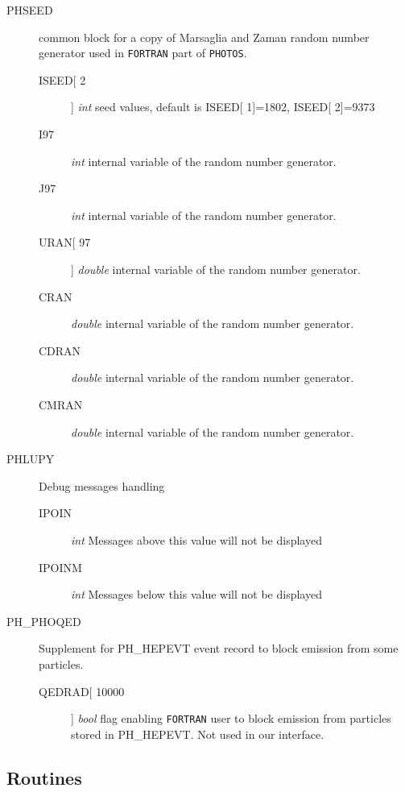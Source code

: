 \documentclass[]{Photos_interface_design}
\begin{document}
\begin{description}
\item[PHSEED] common block for a copy of Marsaglia and Zaman random number generator used in {\tt FORTRAN} part of {\tt PHOTOS}.
    \begin{description}
	\item[ISEED[ 2]]  \textit{int} seed values, default is  ISEED[ 1]=1802, ISEED[ 2]=9373
	\item[I97]        \textit{int} internal variable of the random number generator.
	\item[J97]        \textit{int} internal variable of the random number generator.
	\item[URAN[ 97]]  \textit{double} internal variable of the random number generator.
	\item[CRAN]       \textit{double} internal variable of the random number generator.
	\item[CDRAN]      \textit{double} internal variable of the random number generator.
	\item[CMRAN]      \textit{double} internal variable of the random number generator.
    \end{description}
\end{description}

\begin{description}
\item[PHLUPY] Debug messages handling
    \begin{description}
    \item[IPOIN]  \textit{int} Messages above this value will not be displayed
	\item[IPOINM] \textit{int} Messages below this value will not be displayed
    \end{description}
\end{description}

\begin{description}
\item[PH\_PHOQED] Supplement for PH\_HEPEVT event record to block emission 
from some particles.
    \begin{description}
    \item[QEDRAD[ 10000]]  \textit{bool} flag enabling {\tt FORTRAN} user
    to block emission from particles stored in PH\_HEPEVT. Not used in 
     our interface.
    \end{description}
\end{description}

\subsection{Routines}
\end{document}

